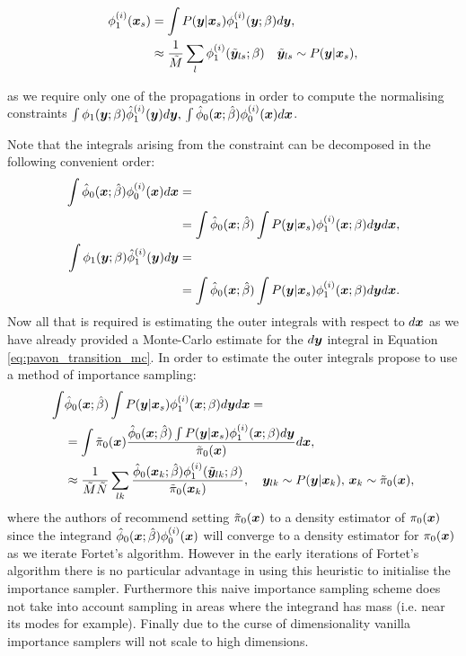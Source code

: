 \documentclass[a4paper,12pt,twoside,openright]{report}
\theoremstyle{definition}
\begin{document}
\begin{align}\label{eq:pavon_transition_mc}
    \phi_1^{(i)}({\bm{x}}_s) &= \int P({\bm{y}}| {\bm{x}}_s) \phi_1^{(i)}({\bm{y}}; \beta) d{\bm{y}}, \nonumber \\
    &\approx \frac{1}{\tilde{M}} \sum_l \phi_1^{(i)}(\tilde{{\bm{y}}}_{ls}; \beta) \quad \tilde{{\bm{y}}}_{ls} \sim   P({\bm{y}}| {\bm{x}}_s),
\end{align}

as we require only one of the propagations in order to compute the normalising constraints  $\int \phi_1({\bm{y}}; {\beta} )   {\hat{\phi}}_1^{(i)}({\bm{y}}) d{\bm{y}} , \, \int {\hat{\phi}}_0({\bm{x}}; \hat{\beta} )   \phi_0^{(i)}({\bm{x}}) d{\bm{x}} $.

\cite{pavon2018data} Note that the integrals arising from the constraint can be decomposed in the following convenient order:
\begin{align}
\int {\hat{\phi}}_0({\bm{x}}; \hat{\beta} )   \phi_0^{(i)}({\bm{x}}) d{\bm{x}} &=\nonumber\\
& = \int  {\hat{\phi}}_0({\bm{x}}; \hat{\beta} ) \int P({\bm{y}}| {\bm{x}}_s) \phi_1^{(i)}({\bm{x}}; \beta) d{\bm{y}} d{\bm{x}}, \\
    \int \phi_1({\bm{y}}; {\beta} )   {\hat{\phi}}_1^{(i)}({\bm{y}}) d{\bm{y}} &=\nonumber\\
    &=\int  {\hat{\phi}}_0({\bm{x}}; \hat{\beta} ) \int P({\bm{y}}| {\bm{x}}_s) \phi_1^{(i)}({\bm{x}}; \beta) d{\bm{y}} d{\bm{x}}.
\end{align}
Now all that is required is estimating the outer integrals with respect to $d{\bm{x}}$ as we have already provided a Monte-Carlo estimate for the $d{\bm{y}}$ integral in Equation \ref{eq:pavon_transition_mc}. In order to estimate the outer integrals  \cite{pavon2018data} propose to use a method of importance sampling:
\begin{align}
    \int&  {\hat{\phi}}_0({\bm{x}}; \hat{\beta} ) \int P({\bm{y}}| {\bm{x}}_s) \phi_1^{(i)}({\bm{x}}; \beta) d{\bm{y}} d{\bm{x}} = \nonumber \\
    & = \int \tilde{\pi}_0({\bm{x}}) \frac{{\hat{\phi}}_0({\bm{x}}; \hat{\beta} ) \int P({\bm{y}}| {\bm{x}}_s) \phi_1^{(i)}({\bm{x}}; \beta) d{\bm{y}}}{\tilde{\pi}_0({\bm{x}})} d{\bm{x}}, \nonumber \\ 
     &\approx  \frac{1}{\tilde{M}\tilde{N}}\sum_{lk} \frac{{\hat{\phi}}_0({\bm{x}}_k; \hat{\beta} )\phi_1^{(i)}(\tilde{{\bm{y}}}_{lk}; \beta) }{\tilde{\pi}_0({\bm{x}}_k)} ,  \quad {\bm{y}}_{lk} \sim   P({\bm{y}}| {\bm{x}}_k), \, {\bm{x}}_k\sim\tilde{\pi}_0({\bm{x}}),
\end{align}
where the authors of \cite{pavon2018data} recommend  setting  $\tilde{\pi}_0({\bm{x}})$ to a density estimator of $\pi_0({\bm{x}})$ since the integrand  ${\hat{\phi}}_0({\bm{x}}; \hat{\beta} )\phi_0^{(i)}({\bm{x}})$ will converge  to a density estimator for  $\pi_0({\bm{x}})$ as we iterate Fortet's algorithm. However in the early iterations of Fortet's algorithm there is no particular advantage in using  this heuristic to initialise the importance sampler. Furthermore this naive importance sampling scheme does not take into account sampling in areas where the integrand has mass (i.e. near its modes for example). Finally due to the curse of dimensionality vanilla importance samplers will not scale to high dimensions.
\end{document}
